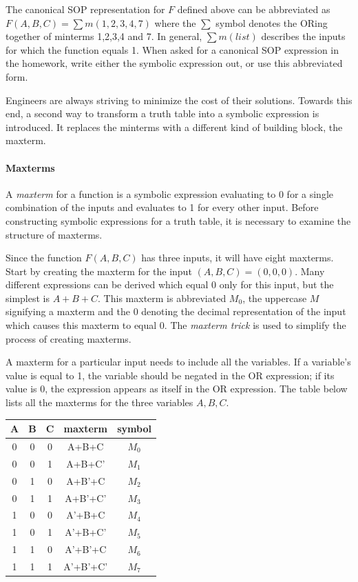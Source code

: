 The canonical SOP representation for $F$ defined above can be 
abbreviated as $F(A,B,C) = \sum m(1,2,3,4,7)$  where the $\sum$
symbol denotes the ORing together of minterms 1,2,3,4 and 7.
In general, $\sum m(list)$ describes the inputs for which the
function equals 1.  When asked for a canonical SOP expression
in the homework, write either the symbolic expression
out, or use this abbreviated form.

Engineers are always striving to minimize the cost of their solutions.
Towards this end, a second way to transform a truth table into a 
symbolic expression is introduced.  It replaces the minterms with 
a different kind of building block, the maxterm.

\paragraph{Maxterms}
A {\it maxterm} for a function is a symbolic expression evaluating
to 0 for a single combination of the inputs and evaluates to 1 for 
every other input.  Before constructing symbolic expressions for
a truth table, it is necessary to examine the structure of maxterms.

Since the function $F(A,B,C)$ has three inputs, it will have eight 
maxterms.  Start by creating the maxterm for the input $(A,B,C)=(0,0,0)$.
Many different expressions can be derived which equal 0 only for
this input, but the simplest is $A+B+C$.  This maxterm is
abbreviated $M_0$, the uppercase $M$ signifying a maxterm 
and the 0 denoting the decimal representation of the input which 
causes this maxterm to equal 0.  The {\it maxterm trick} 
 is used to simplify the process of creating
maxterms.  

A maxterm for a particular input needs to include all the variables.
If a variable's value is equal to 1, the variable should be negated 
in the OR expression; if its value is 0, the expression appears as itself in the
OR expression. The table below lists all the maxterms for the three 
variables $A,B,C$.

\begin{tabular}{c|c|c||c|c}
A & B & C & maxterm   & symbol \\ \hline
0 & 0 & 0 & A+B+C     & $M_0$   \\ \hline
0 & 0 & 1 & A+B+C'    & $M_1$   \\ \hline
0 & 1 & 0 & A+B'+C    & $M_2$   \\ \hline
0 & 1 & 1 & A+B'+C'   & $M_3$   \\ \hline
1 & 0 & 0 & A'+B+C    & $M_4$   \\ \hline
1 & 0 & 1 & A'+B+C'   & $M_5$   \\ \hline
1 & 1 & 0 & A'+B'+C   & $M_6$   \\ \hline
1 & 1 & 1 & A'+B'+C'  & $M_7$   \\ 
\end{tabular}


